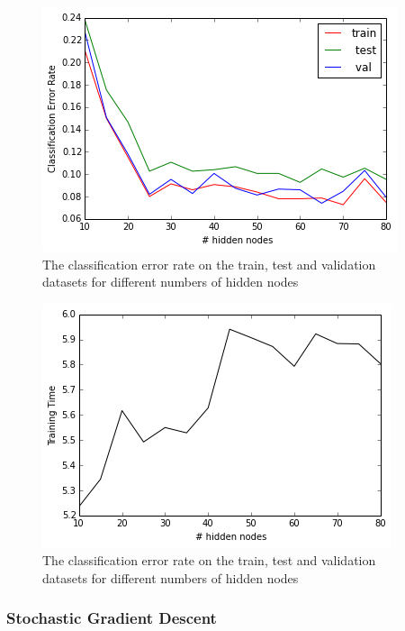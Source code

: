 \documentclass[10pt]{article}
\begin{document}
\begin{figure}
\centering
\includegraphics[scale=0.5]{SGD_toy_data_2_CER.png}
\caption{The classification error rate on the train, test and validation datasets for different numbers of hidden nodes}
\label{SGD_toy_data_2_CER}
\end{figure}
%
\begin{figure}
\centering
\includegraphics[scale=0.5]{SGD_toy_data_2_training_time.png}
\caption{The classification error rate on the train, test and validation datasets for different numbers of hidden nodes}
\label{SGD_toy_data_2_training_time}
\end{figure}



\subsubsection*{Stochastic Gradient Descent}
\end{document}
